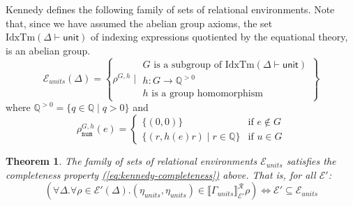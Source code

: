 \documentclass[natbib,preprint]{sigplanconf}
\newcommand{\sepbar}{\mathrel|}
\newcommand{\idxTms}[2]{\mathrm{IdxTm}(#1 \vdash #2)}
\newcommand{\tyPrimNm}[1]{\texttt{#1}}
\newcommand{\relEnv}[1]{\mathcal{#1}}
\newcommand{\rsem}[3]{\llbracket #1 \rrbracket^{\mathcal{R}}_{#2}{#3}}
\newtheorem{theorem}{Theorem}
\begin{document}
Kennedy defines the following family of sets of relational
environments. Note that, since we have assumed the abelian group
axioms, the set $\idxTms{\Delta}{\mathsf{unit}}$ of indexing
expressions quotiented by the equational theory, is an abelian group.
\begin{displaymath}
  \relEnv{E}_{\mathit{units}}(\Delta) = \left\{ \rho^{G,h} \sepbar
    \begin{array}{l}
      G\textrm{ is a subgroup of }\idxTms{\Delta}{\mathsf{unit}} \\
      h : G \to \mathbb{Q}^{>0} \\
      h\textrm{ is a group homomorphism}
    \end{array}
  \right\}
\end{displaymath}
where $\mathbb{Q}^{>0} = \{ q \in \mathbb{Q} \sepbar q > 0 \}$ and
\begin{displaymath}
  \rho^{G,h}_{\tyPrimNm{num}}(e) = \left\{
    \begin{array}{ll}
      \{(0,0)\} & \textrm{if }e \not\in G \\
      \{(r,h(e)r) \sepbar r \in \mathbb{Q} \} & \textrm{if }u \in G
    \end{array}
  \right.
\end{displaymath}

\begin{theorem}
  The family of sets of relational environments
  $\relEnv{E}_{\mathit{units}}$ satisfies the completeness property
  \hyperref[eq:kennedy-completeness]{(\ref*{eq:kennedy-completeness})}
  above. That is, for all $\relEnv{E}'$:
  \begin{displaymath}
    (\forall \Delta.\forall \rho \in \relEnv{E}'(\Delta). (\eta_{\mathit{units}}, \eta_{\mathit{units}}) \in \rsem{\Gamma_{\mathit{units}}}{\relEnv{E}'}{\rho}) \Leftrightarrow \relEnv{E}'\subseteq \relEnv{E}_{\mathit{units}}
  \end{displaymath}
\end{theorem}
\end{document}
